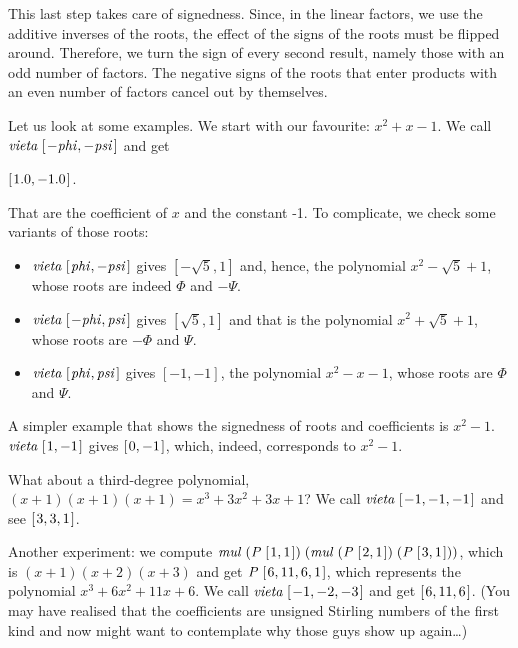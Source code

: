 \documentclass[tikz]{scrreprt}
\newcommand{\Conid}[1]{\mathit{#1}}
\newcommand{\Varid}[1]{\mathit{#1}}
\begin{document}
This last step
takes care of signedness.
Since, in the linear factors, we use the
additive inverses of the roots,
the effect of the signs of the roots
must be flipped around.
Therefore, we turn
the sign of every second result, namely
those with an odd number of factors.
The negative signs of the roots
that enter products with an even number of factors
cancel out by themselves.

Let us look at some examples.
We start with our favourite: $x^2 + x - 1$.
We call \ensuremath{\Varid{vieta}\;[\mskip1.5mu \mathbin{-}\Varid{phi},\mathbin{-}\Varid{psi}\mskip1.5mu]} and get

\ensuremath{[\mskip1.5mu \mathrm{1.0},\mathbin{-}\mathrm{1.0}\mskip1.5mu]}.

That are the coefficient of $x$ and the constant -1.
To complicate, we check some variants of
those roots:

\begin{itemize}
\item \ensuremath{\Varid{vieta}\;[\mskip1.5mu \Varid{phi},\mathbin{-}\Varid{psi}\mskip1.5mu]} gives $[-\sqrt{5}, 1]$ and, hence, the polynomial
$x^2 - \sqrt{5} + 1$, whose roots are indeed $\Phi$ and $-\Psi$.

\item \ensuremath{\Varid{vieta}\;[\mskip1.5mu \mathbin{-}\Varid{phi},\Varid{psi}\mskip1.5mu]} gives $[\sqrt{5}, 1]$ and that is the polynomial
$x^2 + \sqrt{5} + 1$, whose roots are $-\Phi$ and $\Psi$.

\item \ensuremath{\Varid{vieta}\;[\mskip1.5mu \Varid{phi},\Varid{psi}\mskip1.5mu]} gives $[-1, -1]$, the polynomial
$x^2 - x - 1$, whose roots are $\Phi$ and $\Psi$.
\end{itemize}

A simpler example that shows the signedness of roots and coefficients
is $x^2 - 1$. \ensuremath{\Varid{vieta}\;[\mskip1.5mu \mathrm{1},\mathbin{-}\mathrm{1}\mskip1.5mu]} gives \ensuremath{[\mskip1.5mu \mathrm{0},\mathbin{-}\mathrm{1}\mskip1.5mu]}, which, indeed,
corresponds to $x^2  - 1$.

What about a third-degree polynomial,
\eg\ $(x+1)(x+1)(x+1) = x^3 + 3x^2 + 3x + 1$?
We call \ensuremath{\Varid{vieta}\;[\mskip1.5mu \mathbin{-}\mathrm{1},\mathbin{-}\mathrm{1},\mathbin{-}\mathrm{1}\mskip1.5mu]} and see \ensuremath{[\mskip1.5mu \mathrm{3},\mathrm{3},\mathrm{1}\mskip1.5mu]}.

Another experiment: we compute
\ensuremath{\Varid{mul}\;(\Conid{P}\;[\mskip1.5mu \mathrm{1},\mathrm{1}\mskip1.5mu])\;(\Varid{mul}\;(\Conid{P}\;[\mskip1.5mu \mathrm{2},\mathrm{1}\mskip1.5mu])\;(\Conid{P}\;[\mskip1.5mu \mathrm{3},\mathrm{1}\mskip1.5mu]))},
which is $(x+1)(x+2)(x+3)$ and get
\ensuremath{\Conid{P}\;[\mskip1.5mu \mathrm{6},\mathrm{11},\mathrm{6},\mathrm{1}\mskip1.5mu]}, which represents the polynomial
$x^3 + 6x^2 + 11x + 6$.
We call \ensuremath{\Varid{vieta}\;[\mskip1.5mu \mathbin{-}\mathrm{1},\mathbin{-}\mathrm{2},\mathbin{-}\mathrm{3}\mskip1.5mu]} and get \ensuremath{[\mskip1.5mu \mathrm{6},\mathrm{11},\mathrm{6}\mskip1.5mu]}.
(You may have realised that the coefficients are 
unsigned Stirling numbers of the first kind and
now might want to contemplate 
why those guys show up again\dots)
\end{document}
